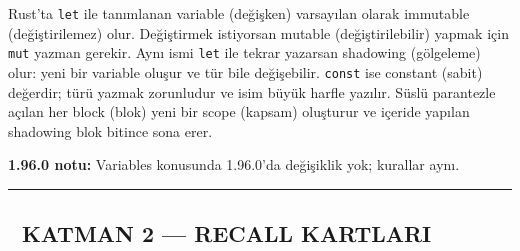 \documentclass[12pt,a4paper]{article}
\begin{document}
Rust'ta \texttt{let} ile tanımlanan variable (değişken) varsayılan olarak immutable (değiştirilemez) olur. Değiştirmek istiyorsan mutable (değiştirilebilir) yapmak için \texttt{mut} yazman gerekir. Aynı ismi \texttt{let} ile tekrar yazarsan shadowing (gölgeleme) olur: yeni bir variable oluşur ve tür bile değişebilir. \texttt{const} ise constant (sabit) değerdir; türü yazmak zorunludur ve isim büyük harfle yazılır. Süslü parantezle açılan her block (blok) yeni bir scope (kapsam) oluşturur ve içeride yapılan shadowing blok bitince sona erer.

\textbf{1.96.0 notu:} Variables konusunda 1.96.0'da değişiklik yok; kurallar aynı.

\begin{center}\rule{0.5\linewidth}{0.5pt}\end{center}

\subsection{🔵 KATMAN 2 --- RECALL KARTLARI}\label{katman-2-—-recall-kartlari-2}
\end{document}
